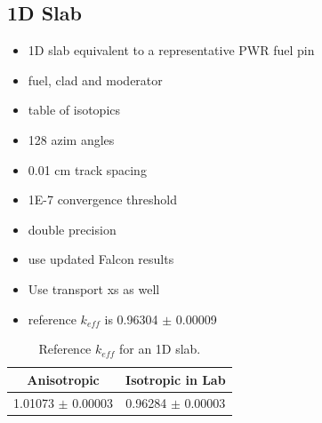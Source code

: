 \subsection{1D Slab}
\label{subsec:chap4-slab}

\begin{itemize}[noitemsep]
  \item 1D slab equivalent to a representative \ac{PWR} fuel pin
  \item fuel, clad and moderator
  \item table of isotopics
  \item 128 azim angles
  \item 0.01 cm track spacing
  \item 1E-7 convergence threshold
  \item double precision
  \item use updated Falcon results
  \item Use transport xs as well
  \item reference $k_{eff}$ is 0.96304 $\pm$ 0.00009
\end{itemize}

\begin{table}[h!]
  \centering
  \caption{Reference $k_{eff}$ for an 1D slab.}
  \label{table:chap2-slab-reference} 
  \vspace{14pt}
  \begin{tabular}{c c}
  \toprule
  \multicolumn{1}{c}{\bf Anisotropic} &
  \multicolumn{1}{c}{\bf Isotropic in Lab} \\
  \midrule
  1.01073 $\pm$ 0.00003 & 0.96284 $\pm$ 0.00003 \\
  \bottomrule
\end{tabular}
\end{table}

